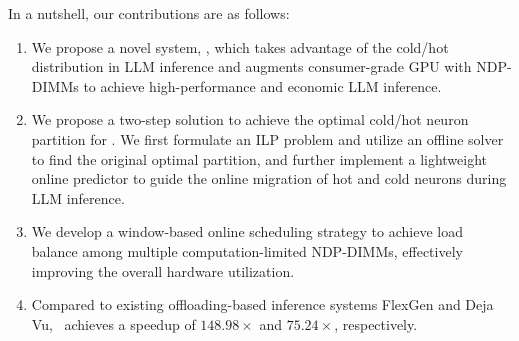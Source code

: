 In a nutshell, our contributions are as follows:
\begin{enumerate}
    \item We propose a novel system, \name, which takes advantage of the cold/hot distribution in LLM inference and augments consumer-grade GPU with NDP-DIMMs to achieve high-performance and economic LLM inference.
    \item We propose a two-step solution to achieve the optimal cold/hot neuron partition for \name. We first formulate an ILP problem and utilize an offline solver to find the original optimal partition, and further implement a lightweight online predictor to guide the online migration of hot and cold neurons during LLM inference. 
    \item We develop a window-based online scheduling strategy to achieve load balance among multiple computation-limited NDP-DIMMs, effectively improving the overall hardware utilization.
    \item Compared to existing offloading-based inference systems FlexGen and Deja Vu, \name~achieves a speedup of $148.98 \times$ and $75.24 \times$, respectively. 
\end{enumerate}
